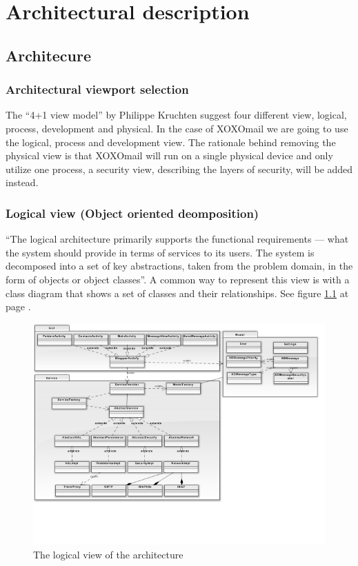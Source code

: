 \chapter{Architectural description}

\section{Architecure}

\subsection{Architectural viewport selection}
The “4+1 view model”\cite{bib:vm} by Philippe Kruchten suggest four different view, logical, process, development and physical. In the case of XOXOmail we are going to use the logical, process and development view. The rationale behind removing the physical view is that XOXOmail will run on a single physical device and only utilize one process, a security view, describing the layers of security, will be added instead.

\subsection{Logical view (Object oriented deomposition)}
“The logical architecture primarily supports the functional requirements --- what the system should provide in terms of services to its users. The system is decomposed into a set of key abstractions, taken from the problem domain, in the form of objects or object classes”\cite{bib:vm}. A common way to represent this view is with a class diagram that shows a set of classes and their relationships.
See figure \ref{fig:logicalview} at page \pageref{fig:logicalview}.

\begin{figure}
	\includegraphics[width=\textwidth]{logicalview.png}
	\caption{The logical view of the architecture}
	\label{fig:logicalview}
\end{figure}

